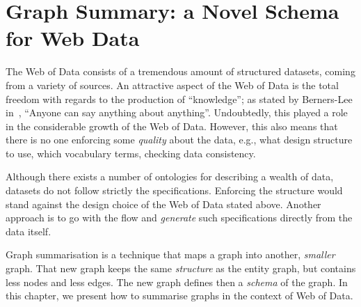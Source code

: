 \chapter{Graph Summary: a Novel Schema for Web Data}
\label{chap:summary}

The Web of Data consists of a tremendous amount of structured datasets, coming from a variety of sources. An attractive aspect of the Web of Data is the total freedom with regards to the production of ``knowledge''; as stated by Berners-Lee in~\cite{tbl:1997:wam}, ``Anyone can say anything about anything''. Undoubtedly, this played a role in the considerable growth of the Web of Data. However, this also means that there is no one enforcing some \emph{quality} about the data, e.g., what design structure to use, which vocabulary terms, checking data consistency.

Although there exists a number of ontologies for describing a wealth of data, datasets do not follow strictly the specifications. Enforcing the structure would stand against the design choice of the Web of Data stated above. Another approach is to go with the flow and \emph{generate} such specifications directly from the data itself.

Graph summarisation is a technique that maps a graph into another, \emph{smaller} graph. That new graph keeps the same \emph{structure} as the entity graph, but contains less nodes and less edges. The new graph defines then a \emph{schema} of the graph. In this chapter, we present how to summarise graphs in the context of Web of Data.
